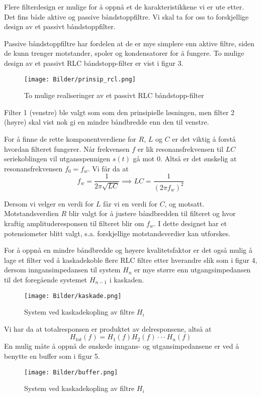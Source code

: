 Flere filterdesign er mulige for å oppnå et de karakteristikkene vi er ute etter. Det fins både aktive og passive 
båndstoppfiltre. Vi skal ta for oss to forskjellige design av et passivt båndstoppfilter.

Passive båndstoppfiltre har fordelen at de er mye simplere enn aktive filtre, siden de kunn trenger motstander, spoler og kondensatorer for å fungere.
To mulige design av et passivt RLC båndstopp-filter er vist i figur 3.

\begin{figure}[H]
    \centering 
    \texttt{[image: Bilder/prinsip\_rcl.png]}
    \caption{To mulige realiseringer av et passivt RLC båndstopp-filter}
\end{figure}

Filter 1 (venstre) ble valgt som som den prinsipielle løsningen, men filter 2 (høyre) skal vist nok gi en mindre båndbredde enn den til venstre.

For å finne de rette komponentverdiene for $R$, $L$ og $C$ er det viktig å forstå hvordan filteret fungerer.
Når frekvensen $f$ er lik resonansfrekvensen til $LC$ seriekoblingen vil utgansspennigen $s(t)$ gå mot 0. Altså 
er det ønskelig at resonansfrekvensen $f_0 = f_w$. Vi får da at 
\[
    f_w = \frac{1}{2\pi \sqrt{LC}} \implies LC = \frac{1}{\left(2\pi f_w\right)^2} 
\]

Dersom vi velger en verdi for $L$ får vi en verdi for $C$, og motsatt. Motstandsverdien $R$ blir valgt for å justere båndbredden
til filteret og hvor kraftig amplituderesponsen til filteret blir om $f_w$. 
I dette designet har et potensiometer blitt valgt, s.a. forskjellige motstandsverdier kan utforskes.

For å oppnå en mindre båndbredde og høyere kvalitetsfaktor er det også mulig å lage et filter ved å 
kaskadekoble flere RLC filtre etter hverandre slik som i figur 4, dersom inngansimpedansen til system $H_n$ er mye større enn 
utgangsimpedansen til det foregående systemet $H_{n-1}$ i kaskaden.

\begin{figure}[H]
    \centering
    \texttt{[image: Bilder/kaskade.png]}
    \caption{System ved kaskadekopling av filtre $H_i$}
\end{figure}

Vi har da at totalresponsen er produktet av delresponsene, altså at 
\[
    H_{tot}(f) = H_1(f) H_2(f) \cdot\cdot\cdot H_n(f)
\]
En mulig måte å oppnå de ønskede inngans- og utgansimpedansene er ved å benytte en buffer som i figur 5.
\begin{figure}[H]
    \centering
    \texttt{[image: Bilder/buffer.png]}
    \caption{System ved kaskadekopling av filtre $H_i$}
\end{figure}

